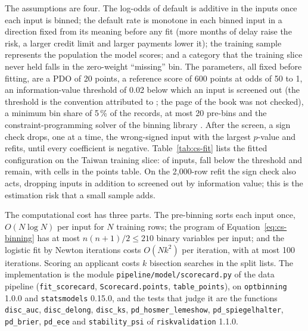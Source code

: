 The assumptions are four. The log-odds of default is additive in the inputs once each input is binned; the default rate is
monotone in each binned input in a direction fixed from its meaning before any fit (more months of delay raise the risk, a larger
credit limit and larger payments lower it); the training sample represents the population the model scores; and a category that
the training slice never held falls in the zero-weight ``missing'' bin. The parameters, all fixed before fitting, are a PDO of 20
points, a reference score of 600 points at odds of 50 to 1, an information-value threshold of 0.02 below which an input is
screened out (the threshold is the convention attributed to \citet{credit-scoring:siddiqi2017}; the page of the book was not
checked), a minimum bin share of 5\,\% of the records, at most 20 pre-bins and the constraint-programming solver of the binning
library \citep{credit-scoring:optbinning}. After the screen, a sign check drops, one at a time, the wrong-signed input with the
largest $p$-value and refits, until every coefficient is negative. Table~\ref{tab:cs-fit} lists the fitted configuration on the
Taiwan training slice: of \csFitTwInputs{} inputs, \csFitTwDropIv{} fall below the threshold and \csFitTwKept{} remain, with
\csFitTwCells{} cells in the points table. On the 2,000-row refit the sign check also acts, dropping \csFitSmDropSign{} inputs in
addition to \csFitSmDropIv{} screened out by information value; this is the estimation risk that a small sample adds.

The computational cost has three parts. The pre-binning sorts each input once, $O(N\log N)$ per input for $N$ training rows; the
program of Equation~\eqref{eq:cs-binning} has at most $n(n+1)/2\le 210$ binary variables per input; and the logistic fit by Newton
iterations costs $O(Nk^2)$ per iteration, with at most 100 iterations. Scoring an applicant costs $k$ bisection searches in the
split lists. The implementation is the module \texttt{pipeline/model/scorecard.py} of the data pipeline (\texttt{fit\_scorecard},
\texttt{Scorecard.points}, \texttt{table\_points}), on \texttt{optbinning} 1.0.0 and \texttt{statsmodels} 0.15.0, and the tests that
judge it are the functions \texttt{disc\_auc}, \texttt{disc\_delong}, \texttt{disc\_ks}, \texttt{pd\_hosmer\_lemeshow},
\texttt{pd\_spiegelhalter}, \texttt{pd\_brier}, \texttt{pd\_ece} and \texttt{stability\_psi} of \texttt{riskvalidation} 1.1.0.



